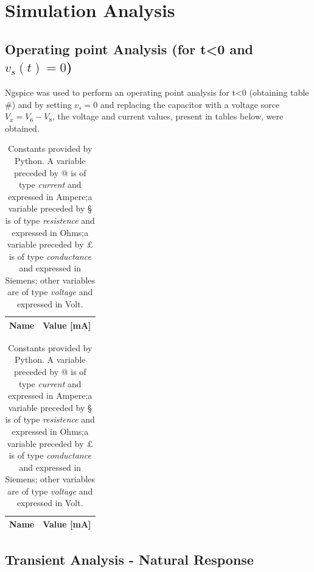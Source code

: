 \section{Simulation Analysis}
\label{sec:simulation}

\subsection{Operating point Analysis (for t<0 and $v_s(t) = 0$)}

Ngspice was used to perform an operating point analysis for t<0 (obtaining table #) and by setting $v_s = 0$ and replacing the capacitor with a voltage sorce $V_x = V_6 - V_8$, the voltage and current values, present in tables below, were obtained.

\begin{table}[!h]
	\centering
	\begin{tabular}{|l|r|}
		\hline    
		{\bf Name} & {\bf Value [mA]} \\ \hline
		
	\end{tabular}
	\caption{Constants provided by Python. A variable preceded by @ is of type {\em current}
		and expressed in Ampere;a variable preceded by § is of type {\it resistence} and expressed in
		Ohms;a variable preceded by £ is of type {\it conductance} and expressed in
		Siemens; other variables are of type {\it voltage} and expressed in
		Volt.}
	\label{tab:op}
\end{table}



\begin{table}[!h]
	\centering
	\begin{tabular}{|l|r|}
		\hline    
		{\bf Name} & {\bf Value [mA]} \\ \hline
		
	\end{tabular}
	\caption{Constants provided by Python. A variable preceded by @ is of type {\em current}
		and expressed in Ampere;a variable preceded by § is of type {\it resistence} and expressed in
		Ohms;a variable preceded by £ is of type {\it conductance} and expressed in
		Siemens; other variables are of type {\it voltage} and expressed in
		Volt.}
	\label{tab:op}
\end{table}


\subsection{Transient Analysis - Natural Response}

